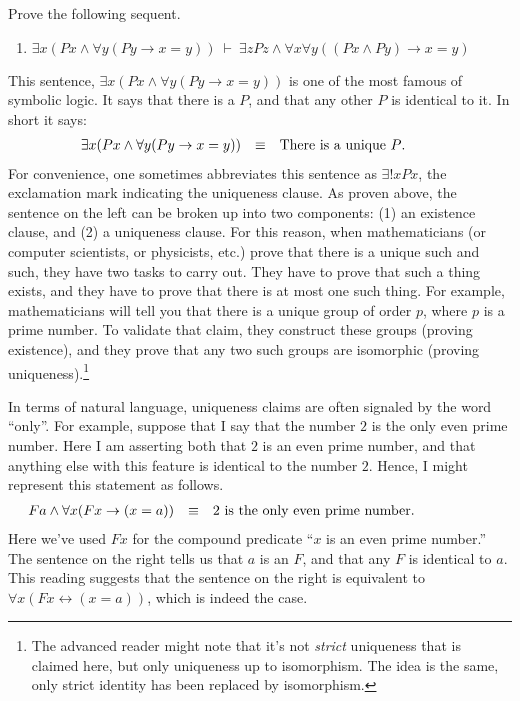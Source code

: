 \begin{exercises} Prove the following sequent. \begin{enumerate}
    \item $\exists x(Px\wedge \forall y(Py\to x=y))\:\vdash\:\exists zPz\wedge \forall x\forall y((Px\wedge Py)\to
      x=y)$ \end{enumerate} \end{exercises}

This sentence, $\exists x(Px\wedge \forall y(Py\to x=y))$ is one of
the most famous of symbolic logic.  It says that there is a $P$, and
that any other $P$ is identical to it.  In short it says:
\[ \begin{array}{l c p{4cm}} \exists x(Px\wedge \forall y(Py\to x=y))
     & \equiv & There is a unique $P$. \end{array} \] For convenience,
 one sometimes abbreviates this sentence as $\exists !xPx$, the
 exclamation mark indicating the uniqueness clause.  As proven above, the sentence on the left
can be broken up into two components: (1) an existence clause, and (2)
a uniqueness clause.  For this reason, when mathematicians (or
computer scientists, or physicists, etc.) prove that there is a unique
such and such, they have two tasks to carry out.  They have to prove
that such a thing exists, and they have to prove that there is at most
one such thing.  For example, mathematicians will tell you that there
is a unique group of order $p$, where $p$ is a prime number.  To
validate that claim, they construct these groups (proving existence),
and they prove that any two such groups are isomorphic (proving
uniqueness).\footnote{The advanced reader might note that it's not
  {\it strict} uniqueness that is claimed here, but only uniqueness up
to isomorphism.  The idea is the same, only strict identity has been
replaced by isomorphism.}

In terms of natural language, uniqueness claims are often signaled
by the word ``only''.  For example, suppose that I say that the number
$2$ is the only even prime number.  Here I am asserting
both that $2$ is an even prime number, and that anything else with
this feature is identical to the number $2$.  
Hence, I might represent this statement as follows.
\[ \begin{array}{r c p{7cm}}
Fa\wedge\forall x(Fx\to (x=a)) & \equiv & $2$ is the only even prime number. \end{array} \]
Here we've used $Fx$ for the compound predicate ``$x$ is an even prime
number.''  The sentence on the right tells us that
$a$ is an $F$, and that any $F$ is identical to $a$.  This reading
suggests that the sentence on the right is equivalent to $\forall
x(Fx\leftrightarrow (x=a))$, which is indeed the case.

